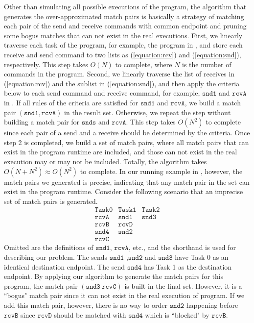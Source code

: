 Other than simulating all possible executions of the program, the algorithm that generates the over-approximated match pairs is basically a strategy of matching each pair of the send and receive commands with common endpoint and pruning some bogus matches that can not exist in the real executions. First, we linearly traverse each task of the program, for example, the program in , and store each receive and send command to two lists as (\ref{equation:rcv}) and (\ref{equation:snd}), respectively. This step takes $O(N)$ to complete, where $N$ is the number of commands in the program. Second, we linearly traverse the list of receives in (\ref{equation:rcv}) and the sublist in (\ref{equation:snd}), and then apply the criteria below to each send command and receive command, for example, $\mathtt{snd1}$ and $\mathtt{rcvA}$ in . If all rules of the criteria are satisfied for $\mathtt{snd1}$ and $\mathtt{rcvA}$, we build a match pair $(\mathtt{snd1},\mathtt{rcvA})$ in the result set. Otherwise, we repeat the step without building a match pair for $\mathtt{snds}$ and $\mathtt{rcvA}$. This step takes $O(N^2)$ to complete since each pair of a send and a receive should be determined by the criteria. Once step 2 is completed, we build a set of match pairs, where all match pairs that can exist in the program runtime are included, and those can not exist in the real execution may or may not be included. Totally, the algorithm takes $O(N + N^2) \approx O(N^2)$ to complete. In our running example in , however, the match pairs we generated is precise, indicating that any match pair in the set can exist in the program runtime. Consider the following scenario that an imprecise set of match pairs is generated. 
\[
\begin{array}{ccc}
\mathtt{Task 0} &  \mathtt{Task 1} & \mathtt{Task 2}\\
\mathtt{rcvA} & \mathtt{snd1} & \mathtt{snd3} \\
\mathtt{rcvB} & \mathtt{rcvD} &  \\
\mathtt{snd4} & \mathtt{snd2} & \\
\mathtt{rcvC} & &
\end{array}
\] 
Omitted are the definitions of $\mathtt{snd1}$, $\mathtt{rcvA}$, etc., and the shorthand is used for describing our problem. The sends $\mathtt{snd1}$ ,$\mathtt{snd2}$ and $\mathtt{snd3}$ have Task 0 as an identical destination endpoint. The send $\mathtt{snd4}$ has Task 1 as the destination endpoint. By applying our algorithm to generate the match pairs for this program, the match pair $(\mathtt{snd3}\ \mathtt{rcvC})$ is built in the final set. However, it is a ``bogus" match pair since it can not exist in the real execution of program. If we add this match pair, however, there is no way to order $\mathtt{snd2}$ happening before $\mathtt{rcvB}$ since $\mathtt{rcvD}$ should be matched with $\mathtt{snd4}$ which is ``blocked" by $\mathtt{rcvB}$.

